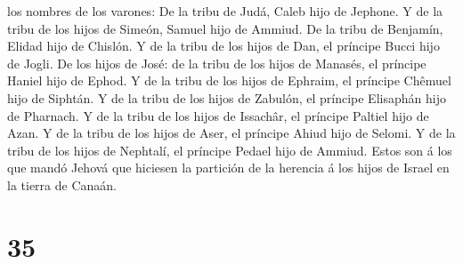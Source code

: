 los nombres de los varones: De la tribu de Judá, Caleb hijo de Jephone.
 Y de la tribu de los hijos de Simeón, Samuel hijo de
Ammiud.  De la tribu de Benjamín, Elidad hijo de Chislón.
 Y de la tribu de los hijos de Dan, el príncipe Bucci
hijo de Jogli.  De los hijos de José: de la tribu de los
hijos de Manasés, el príncipe Haniel hijo de Ephod.  Y de
la tribu de los hijos de Ephraim, el príncipe Chêmuel hijo de Siphtán.
 Y de la tribu de los hijos de Zabulón, el príncipe
Elisaphán hijo de Pharnach.  Y de la tribu de los hijos
de Issachâr, el príncipe Paltiel hijo de Azan.  Y de la
tribu de los hijos de Aser, el príncipe Ahiud hijo de Selomi.
 Y de la tribu de los hijos de Nephtalí, el príncipe
Pedael hijo de Ammiud.  Estos son á los que mandó Jehová
que hiciesen la partición de la herencia á los hijos de Israel en la
tierra de Canaán.

\hypertarget{section-34}{%
\section{35}\label{section-34}}

